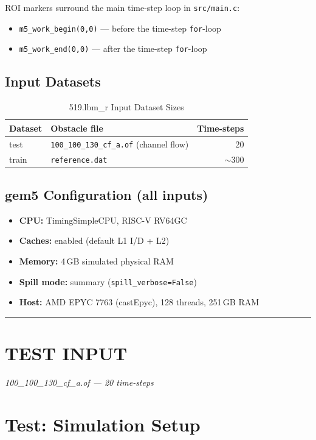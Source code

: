 \documentclass[conference]{IEEEtran}
\newcommand{\inputpart}[2]{%
    \vspace{1em}
    \noindent\rule{\linewidth}{0.4pt}
    \section{#1}
    \textit{#2}
    \vspace{0.2em}
}
\begin{document}
ROI markers surround the main time-step loop in \texttt{src/main.c}:
\begin{itemize}
    \item \texttt{m5\_work\_begin(0,0)} --- before the time-step \texttt{for}-loop
    \item \texttt{m5\_work\_end(0,0)}   --- after  the time-step \texttt{for}-loop
\end{itemize}

\subsection{Input Datasets}

\begin{table}[H]
\centering
\caption{519.lbm\_r Input Dataset Sizes}
\label{tab:inputs}
\begin{tabular}{llr}
\toprule
\textbf{Dataset} & \textbf{Obstacle file} & \textbf{Time-steps} \\
\midrule
test  & \texttt{100\_100\_130\_cf\_a.of} (channel flow)   & 20 \\
train & \texttt{reference.dat}                             & $\sim$300 \\
\bottomrule
\end{tabular}
\end{table}

\subsection{gem5 Configuration (all inputs)}

\begin{itemize}
    \item \textbf{CPU:} TimingSimpleCPU, RISC-V RV64GC
    \item \textbf{Caches:} enabled (default L1 I/D + L2)
    \item \textbf{Memory:} 4\,GB simulated physical RAM
    \item \textbf{Spill mode:} summary (\texttt{spill\_verbose=False})
    \item \textbf{Host:} AMD EPYC 7763 (castEpyc), 128 threads, 251\,GB RAM
\end{itemize}

\inputpart{TEST INPUT}{100\_100\_130\_cf\_a.of --- 20 time-steps}

\section{Test: Simulation Setup}
\end{document}
